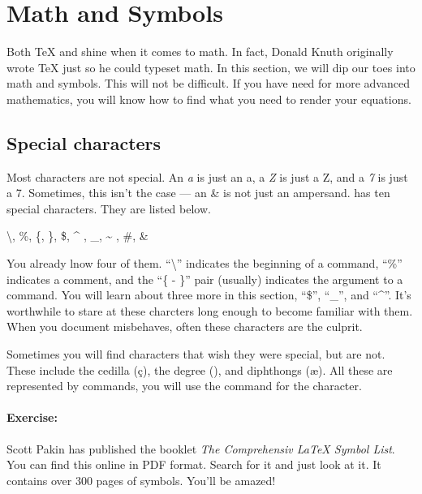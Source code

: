     \section{Math and Symbols}
    \label{Math}

	Both \TeX{} and \Lx{} shine when it comes to math. In fact, Donald Knuth originally wrote \TeX{} just so he could typeset math. In this section, we will dip our toes into math and symbols. This will not be difficult. If you have need for more advanced mathematics, you will know how to find what you need to render your equations.

        \subsection{Special characters}
        \label{Special-characters}
        
		Most characters are not special. An \textit{a} is just an a, a \textit{Z} is just a Z, and a \textit{7} is just a 7. Sometimes, this isn't the case --- an \&  is not just an ampersand. \Lx{} has ten special characters. They are listed below.

        \begin{framed}
			\textbackslash, \%, \{, \}, \$, \^{} , \_, \~{} , \#, \&
            \index{\textbackslash}
            \index{\%}
            \index{\{\}}
            \index{\$}
            \index{\^{}}
            \index{\_}
            \index{\#}
            \index{\&}
        \end{framed}

		You already lnow four of them. ``\textbackslash'' indicates the beginning of a command, ``\%'' indicates a comment, and the ``\{ - \}'' pair (usually) indicates the argument to a command. You will learn about three more in this section, ``\$'', ``\_'', and ``\^{}''. It's worthwhile to stare at these charcters long enough to become familiar with them. When you document misbehaves, often these characters are the culprit.

		Sometimes you will find characters that wish they were special, but are not. These include the cedilla (\c{c}), the degree (\textdegree), and diphthongs (\ae). All these are represented by \Lx{} commands, you will use the command for the character.

		\paragraph{Exercise:}Scott Pakin has published the booklet \textit{The Comprehensiv \LaTeX{} Symbol List}. You can find this online in PDF format. Search for it and just look at it. It contains over 300 pages of symbols. You'll be amazed! 

